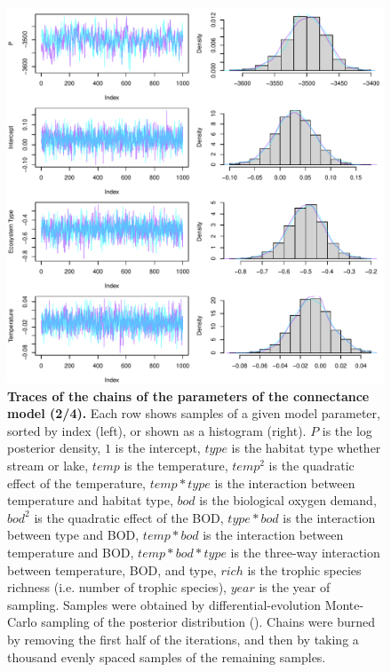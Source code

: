 \documentclass[11pt, oneside]{article}
\begin{document}
\begin{figure}[H]
\begin{center}
\includegraphics[page=2, width=1\linewidth]{scripts/b0_6_4/out_con/fig_tracePlot_beta.pdf}
\caption{
    \textbf{Traces of the chains of the parameters of the connectance model (2/4).}
    Each row shows samples of a given model parameter, sorted by index (left), or shown as a histogram (right).
    $P$ is the log posterior density, $1$ is the intercept, $type$ is the habitat type whether stream or lake, $temp$ is the temperature, $temp^2$ is the quadratic effect of the temperature, $temp * type$ is the interaction between temperature and habitat type, $bod$ is the biological oxygen demand, $bod^2$ is the quadratic effect of the BOD, $type * bod$ is the interaction between type and BOD, $temp * bod$ is the interaction between temperature and BOD, $temp * bod * type$ is the three-way interaction between temperature, BOD, and type, $rich$ is the trophic species richness (i.e. number of trophic species), $year$ is the year of sampling.
    Samples were obtained by differential-evolution Monte-Carlo sampling of the posterior distribution (\cite{TerBraak2006}).
    Chains were burned by removing the first half of the iterations, and then by taking a thousand evenly spaced samples of the remaining samples.
}
\end{center}
\end{figure}
\end{document}
